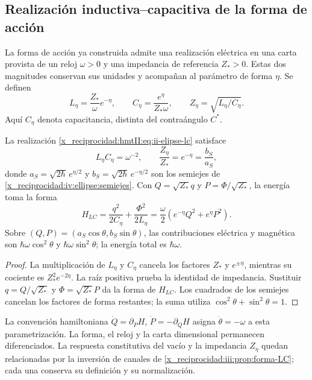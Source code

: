 \subsection{Realización inductiva--capacitiva de la forma de acción}
\label{x_reciprocidad:nuclear:realizacion-lc}

La forma de acción ya construida admite una realización eléctrica en
una carta provista de un reloj \(\omega>0\) y una impedancia de
referencia \(Z_*>0\). Estas dos magnitudes conservan sus unidades y
acompañan al parámetro de forma \(\eta\). Se definen
\begin{equation}
 L_\eta=\frac{Z_*}{\omega}e^{-\eta},\qquad
 C_\eta=\frac{e^\eta}{Z_*\omega},\qquad
 Z_\eta=\sqrt{L_\eta/C_\eta}.
 \label{x_reciprocidad:hmtII:eq:ii-elipse-lc}
\end{equation}
Aquí \(C_\eta\) denota capacitancia, distinta del contraángulo \(C^*\).

\begin{proposition}
\label{x_reciprocidad:nuclear:lc-producto}
La realización \eqref{x_reciprocidad:hmtII:eq:ii-elipse-lc} satisface
\begin{equation}
 L_\eta C_\eta=\omega^{-2},\qquad
 \frac{Z_\eta}{Z_*}=e^{-\eta}=\frac{b_S}{a_S},
 \label{x_reciprocidad:hmtII:eq:ii-elipse-impedancia}
\end{equation}
donde \(a_S=\sqrt{2\hbar}\,e^{\eta/2}\) y
\(b_S=\sqrt{2\hbar}\,e^{-\eta/2}\) son los semiejes de
\cref{x_reciprocidad:iv:ellipse:semiejes}.
Con \(Q=\sqrt{Z_*}q\) y \(P=\Phi/\sqrt{Z_*}\), la energía toma la forma
\[
 H_{LC}=\frac{q^2}{2C_\eta}+\frac{\Phi^2}{2L_\eta}
       =\frac\omega2(e^{-\eta}Q^2+e^\eta P^2).
\]
Sobre \((Q,P)=(a_S\cos\theta,b_S\sin\theta)\), las contribuciones
eléctrica y magnética son \(\hbar\omega\cos^2\theta\) y
\(\hbar\omega\sin^2\theta\); la energía total es \(\hbar\omega\).
\end{proposition}
\begin{proof}
La multiplicación de \(L_\eta\) y \(C_\eta\) cancela los factores
\(Z_*\) y \(e^{\pm\eta}\), mientras su cociente es
\(Z_*^2e^{-2\eta}\). La raíz positiva prueba la identidad de impedancia.
Sustituir \(q=Q/\sqrt{Z_*}\) y \(\Phi=\sqrt{Z_*}P\) da la forma
de \(H_{LC}\). Los cuadrados de los semiejes cancelan los factores
de forma restantes; la suma utiliza \(\cos^2\theta+\sin^2\theta=1\).
\end{proof}

La convención hamiltoniana
\(\dot Q=\partial_PH\), \(\dot P=-\partial_QH\) asigna
\(\dot\theta=-\omega\) a esta parametrización. La forma, el reloj
y la carta dimensional permanecen diferenciados. La respuesta
constitutiva del vacío y la impedancia \(Z_\eta\) quedan relacionadas
por la inversión de canales de \cref{x_reciprocidad:iii:prop:forma-LC}; cada una
conserva su definición y su normalización.
